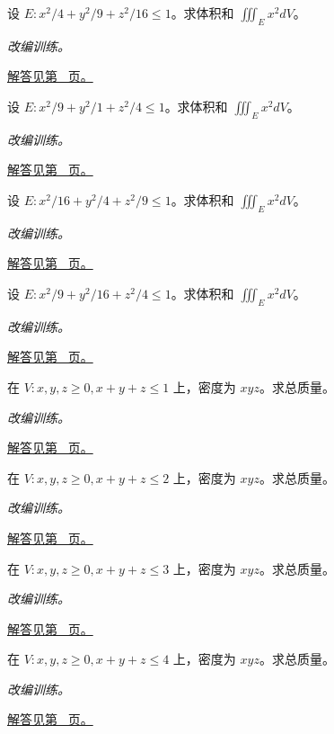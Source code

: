 \documentclass[UTF8,12pt,a4paper,fontset=fandol]{ctexart}
\begin{document}
\begin{example}[椭球体积与二次矩]\label{ex:c39q15}
设 $E:x^2/4+y^2/9+z^2/16\le1$。求体积和 $\iiint_Ex^2dV$。
\par\textit{改编训练。}\par\hyperref[ans:c39q15]{解答见第~\pageref{ans:c39q15} 页。}
\end{example}
\begin{example}[椭球体积与二次矩]\label{ex:c39q16}
设 $E:x^2/9+y^2/1+z^2/4\le1$。求体积和 $\iiint_Ex^2dV$。
\par\textit{改编训练。}\par\hyperref[ans:c39q16]{解答见第~\pageref{ans:c39q16} 页。}
\end{example}
\begin{example}[椭球体积与二次矩]\label{ex:c39q17}
设 $E:x^2/16+y^2/4+z^2/9\le1$。求体积和 $\iiint_Ex^2dV$。
\par\textit{改编训练。}\par\hyperref[ans:c39q17]{解答见第~\pageref{ans:c39q17} 页。}
\end{example}
\begin{example}[椭球体积与二次矩]\label{ex:c39q18}
设 $E:x^2/9+y^2/16+z^2/4\le1$。求体积和 $\iiint_Ex^2dV$。
\par\textit{改编训练。}\par\hyperref[ans:c39q18]{解答见第~\pageref{ans:c39q18} 页。}
\end{example}
\begin{example}[单纯形上的乘积密度]\label{ex:c39q19}
在 $V:x,y,z\ge0, x+y+z\le 1$ 上，密度为 $xyz$。求总质量。
\par\textit{改编训练。}\par\hyperref[ans:c39q19]{解答见第~\pageref{ans:c39q19} 页。}
\end{example}
\begin{example}[单纯形上的乘积密度]\label{ex:c39q20}
在 $V:x,y,z\ge0, x+y+z\le 2$ 上，密度为 $xyz$。求总质量。
\par\textit{改编训练。}\par\hyperref[ans:c39q20]{解答见第~\pageref{ans:c39q20} 页。}
\end{example}
\begin{example}[单纯形上的乘积密度]\label{ex:c39q21}
在 $V:x,y,z\ge0, x+y+z\le 3$ 上，密度为 $xyz$。求总质量。
\par\textit{改编训练。}\par\hyperref[ans:c39q21]{解答见第~\pageref{ans:c39q21} 页。}
\end{example}
\begin{example}[单纯形上的乘积密度]\label{ex:c39q22}
在 $V:x,y,z\ge0, x+y+z\le 4$ 上，密度为 $xyz$。求总质量。
\par\textit{改编训练。}\par\hyperref[ans:c39q22]{解答见第~\pageref{ans:c39q22} 页。}
\end{example}
\end{document}
